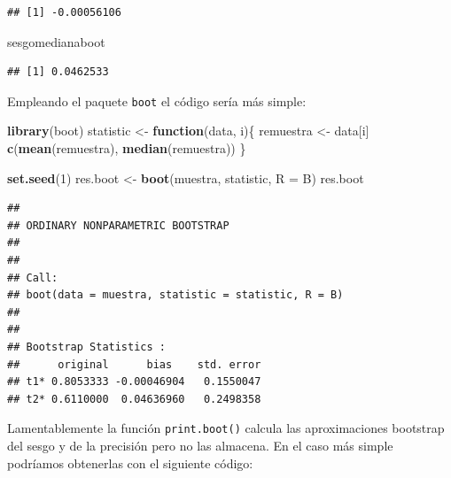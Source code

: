 \documentclass[]{book}
\newenvironment{Shaded}{\begin{snugshade}}{\end{snugshade}}
\newcommand{\KeywordTok}[1]{\textcolor[rgb]{0.13,0.29,0.53}{\textbf{#1}}}
\newcommand{\DataTypeTok}[1]{\textcolor[rgb]{0.13,0.29,0.53}{#1}}
\newcommand{\DecValTok}[1]{\textcolor[rgb]{0.00,0.00,0.81}{#1}}
\newcommand{\StringTok}[1]{\textcolor[rgb]{0.31,0.60,0.02}{#1}}
\newcommand{\OtherTok}[1]{\textcolor[rgb]{0.56,0.35,0.01}{#1}}
\newcommand{\ControlFlowTok}[1]{\textcolor[rgb]{0.13,0.29,0.53}{\textbf{#1}}}
\newcommand{\OperatorTok}[1]{\textcolor[rgb]{0.81,0.36,0.00}{\textbf{#1}}}
\newcommand{\NormalTok}[1]{#1}
\theoremstyle{definition}
\theoremstyle{definition}
\theoremstyle{definition}
\theoremstyle{remark}
\begin{document}
\begin{verbatim}
## [1] -0.00056106
\end{verbatim}

\begin{Shaded}
\begin{Highlighting}[]
\NormalTok{sesgomedianaboot}
\end{Highlighting}
\end{Shaded}

\begin{verbatim}
## [1] 0.0462533
\end{verbatim}

Empleando el paquete \texttt{boot} el código sería más simple:

\begin{Shaded}
\begin{Highlighting}[]
\KeywordTok{library}\NormalTok{(boot)}
\NormalTok{statistic <-}\StringTok{ }\ControlFlowTok{function}\NormalTok{(data, i)\{}
\NormalTok{  remuestra <-}\StringTok{ }\NormalTok{data[i]}
  \KeywordTok{c}\NormalTok{(}\KeywordTok{mean}\NormalTok{(remuestra), }\KeywordTok{median}\NormalTok{(remuestra))}
\NormalTok{\}}

\KeywordTok{set.seed}\NormalTok{(}\DecValTok{1}\NormalTok{)}
\NormalTok{res.boot <-}\StringTok{ }\KeywordTok{boot}\NormalTok{(muestra, statistic, }\DataTypeTok{R =}\NormalTok{ B)}
\NormalTok{res.boot}
\end{Highlighting}
\end{Shaded}

\begin{verbatim}
## 
## ORDINARY NONPARAMETRIC BOOTSTRAP
## 
## 
## Call:
## boot(data = muestra, statistic = statistic, R = B)
## 
## 
## Bootstrap Statistics :
##      original      bias    std. error
## t1* 0.8053333 -0.00046904   0.1550047
## t2* 0.6110000  0.04636960   0.2498358
\end{verbatim}

Lamentablemente la función \texttt{print.boot()} calcula las
aproximaciones bootstrap del sesgo y de la precisión pero no las
almacena. En el caso más simple podríamos obtenerlas con el siguiente
código:

\begin{Shaded}
\end{Shaded}
\end{document}

